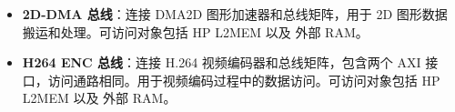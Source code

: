 \documentclass[main\_\_CN.tex]{subfiles}
\begin{document}
\begin{itemize}
\begin{itemize}
            \item \textbf{GDMA-AHB}：基于 AHB 总线协议的 DMA 控制器
            \item \textbf{GDMA-AXI}：基于 AXI 总线协议的 DMA 控制器
            \item \textbf{VDMA}： 基于 AXI 总线协议的 Video DMA 控制器
        \end{itemize}
        DMA 均提供一条连接至总线矩阵的线路和一条连接外部存储器的线路。GDMA 通过这些总线进行高速数据传输，包括外设到内存、内存到外设、外设到外设以及内存到内存的传输。可访问对象包括 HP L2MEM,以及外部 flash 和 外部 RAM。针对 DMA 访问外部存储器的场景，为确保数据吞吐率，建议尽可能设置较长的 burst 长度。
    \item \textbf{2D-DMA 总线}：连接 DMA2D 图形加速器和总线矩阵，用于 2D 图形数据搬运和处理。可访问对象包括 HP L2MEM 以及 外部 RAM。
    \item \textbf{H264 ENC 总线}：连接 H.264 视频编码器和总线矩阵，包含两个 AXI 接口，访问通路相同。用于视频编码过程中的数据访问。可访问对象包括 HP L2MEM 以及 外部 RAM。
\end{itemize}
\end{document}
